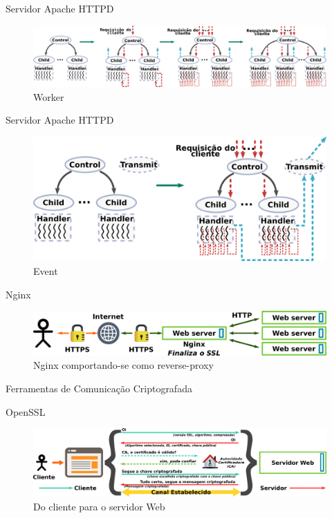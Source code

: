 \documentclass[xcolor={usenames,svgnames,dvipsnames},brazil,english,12pt,aspectratio=149]{beamer}
\begin{document}
\begin{frame}{Servidor Apache HTTPD}
	\begin{figure}[!h]
		\centering
		\includegraphics[width=\textwidth]{worker} 
		\caption{Worker}
		\label{fig:worker} 
	\end{figure}
\end{frame}

\begin{frame}{Servidor Apache HTTPD}
	\begin{figure}[!h]
		\centering
		\includegraphics[width=.7\textwidth]{event} 
		\caption{Event}
		\label{fig:event} 
	\end{figure}
\end{frame}

\begin{frame}{Nginx}
	\begin{figure}[!h]
		\centering
		\includegraphics[width=\textwidth]{nginx_load_balancer_ex} 
		\caption{Nginx comportando-se como reverse-proxy}
		\label{fig:nginx_basico} 
	\end{figure}
\end{frame}

\begin{frame}{Ferramentas de Comunicação Criptografada}
\end{frame}

\begin{frame}{OpenSSL}
	\begin{figure}[!h]
		\centering
		\includegraphics[width=\textwidth]{ssl_handshake}
		\caption{Do cliente para o servidor Web}
		\label{fig:openssl_handshake}
	\end{figure}
\end{frame}
\end{document}
